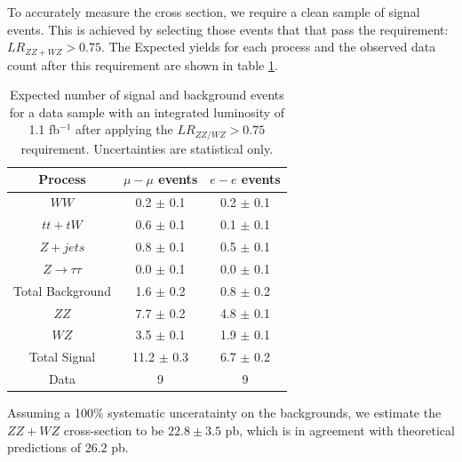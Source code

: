 To accurately measure the cross section, we require a clean sample of signal events. 
This is achieved by selecting those events that 
that pass the requirement: $LR_{ZZ+WZ}>0.75$. 
The Expected yields for each process and the observed data count after this requirement
are shown in table \ref{tab:ZZWZselection}.

\begin{table}[!hbtp]
  \begin{center}
  \begin{tabular} {c|c|c}
 \hline
  Process & $\mu-\mu$ events  & $e-e$ events \\
  \hline
  \hline
  $WW$                  &  0.2 $\pm$  0.1 &  0.2 $\pm$   0.1 \\
  $tt + tW$             &  0.6 $\pm$  0.1 &  0.1 $\pm$   0.1 \\
  $Z  + jets$           &  0.8 $\pm$  0.1 &  0.5 $\pm$   0.1\\
  $Z\rightarrow \tau\tau$& 0.0 $\pm$  0.1 &  0.0 $\pm$   0.1\\
  \hline
  Total Background      &  1.6 $\pm$  0.2 &  0.8 $\pm$   0.2\\
  \hline
  $ZZ$                  &  7.7 $\pm$  0.2 &  4.8 $\pm$   0.1\\
  $WZ$                  &  3.5  $\pm$ 0.1 &  1.9 $\pm$   0.1\\
 \hline
  Total Signal          &  11.2 $\pm$ 0.3 &  6.7 $\pm$   0.2\\
 \hline
  Data                  &  9               &   9              \\
 \hline
  \end{tabular}

  \caption{Expected number of signal and background events for a data sample with an 
  integrated luminosity of 1.1 fb$^{-1}$ after applying the $LR_{ZZ/WZ}>0.75$ requirement. 
 Uncertainties are statistical only.}
   \label{tab:ZZWZselection}
  \end{center}
\end{table}

Assuming a 100$\%$ systematic unceratainty on the backgrounds, we estimate the $ZZ+WZ$ 
cross-section to be $22.8 \pm 3.5$ pb, which is in agreement with theoretical predictions of $26.2$ pb.

